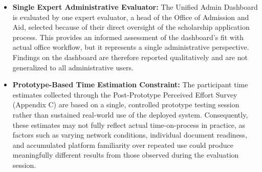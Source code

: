\begin{itemize}
  \item \textbf{Single Expert Administrative Evaluator:} The Unified Admin
Dashboard is evaluated by one expert evaluator, a head of the Office of
Admission and Aid, selected because of their direct oversight of the
scholarship application process. This provides an informed assessment of
the dashboard's fit with actual office workflow, but it represents a
single administrative perspective. Findings on the dashboard are
therefore reported qualitatively and are not generalized to all
administrative users.
  \item \textbf{Prototype-Based Time Estimation Constraint:} The participant time estimates collected through the Post-Prototype Perceived Effort Survey (Appendix C) are based on a single, controlled prototype testing session rather than sustained real-world use of the deployed system. Consequently, these estimates may not fully reflect actual time-on-process in practice, as factors such as varying network conditions, individual document readiness, and accumulated platform familiarity over repeated use could produce meaningfully different results from those observed during the evaluation session.
\end{itemize}




